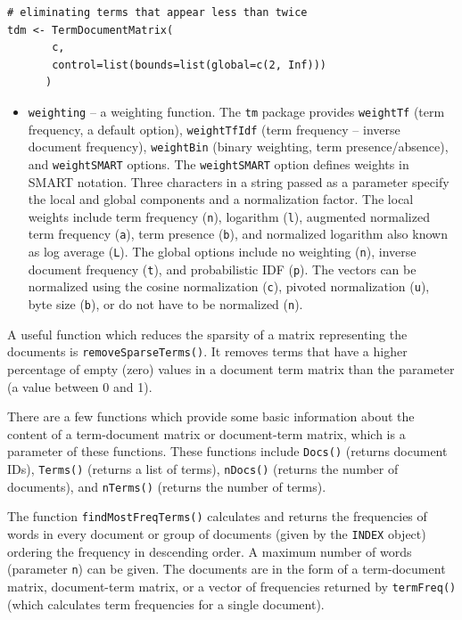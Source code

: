 \begin{verbatim}
# eliminating terms that appear less than twice
tdm <- TermDocumentMatrix(
       c,
       control=list(bounds=list(global=c(2, Inf)))
      )
\end{verbatim}

\begin{itemize}
    \item \texttt{weighting} – a weighting function. The \texttt{tm} package provides \texttt{weightTf}
(term frequency, a default option), \texttt{weightTfIdf} (term frequency – inverse document frequency), \texttt{weightBin} (binary weighting, term presence/absence), and \texttt{weightSMART} options. The \texttt{weightSMART} option defines weights in SMART notation. Three characters in a string passed as
a parameter specify the local and global components and a normalization
factor. The local weights include term frequency (\texttt{n}), logarithm (\texttt{l}), augmented normalized term frequency (\texttt{a}), term presence (\texttt{b}), and normalized logarithm also known as log average (\texttt{L}). The global options include
no weighting (\texttt{n}), inverse document frequency (\texttt{t}), and probabilistic IDF (\texttt{p}). The vectors can be normalized using the cosine normalization (\texttt{c}),
pivoted normalization (\texttt{u}), byte size (\texttt{b}), or do not have to be normalized (\texttt{n}).
\end{itemize}

A useful function which reduces the sparsity of a matrix representing the
documents is \texttt{removeSparseTerms()}. It removes terms that have a higher percentage of empty (zero) values in a document term matrix than the parameter (a
value between 0 and 1).

There are a few functions which provide some basic information about the
content of a term-document matrix or document-term matrix, which is a parameter of these functions. These functions include \texttt{Docs()} (returns document IDs),
\texttt{Terms()} (returns a list of terms), \texttt{nDocs()} (returns the number of documents),
and \texttt{nTerms()} (returns the number of terms).

The function \texttt{findMostFreqTerms()} calculates and returns the frequencies of words in every document or group of documents (given by the \texttt{INDEX}
object) ordering the frequency in descending order. A maximum number of
words (parameter \texttt{n}) can be given. The documents are in the form of a term-document matrix, document-term matrix, or a vector of frequencies returned by
\texttt{termFreq()} (which calculates term frequencies for a single document).

